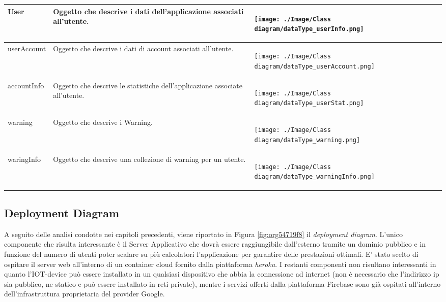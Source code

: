 \documentclass[onecolumn,a4paper]{article}
\begin{document}
\begin{longtable}{|l|p{5.2cm}|p{4cm}|}
\hline
User & Oggetto che descrive i dati dell'applicazione associati all'utente. & \begin{center}
\texttt{[image: ./Image/Class diagram/dataType\_userInfo.png]}
\end{center}\\
\hline
userAccount & Oggetto che descrive i dati di account associati all'utente. & \begin{center}
\texttt{[image: ./Image/Class diagram/dataType\_userAccount.png]}
\end{center}\\
\hline
accountInfo & Oggetto che descrive le statistiche dell'applicazione associate all'utente. & \begin{center}
\texttt{[image: ./Image/Class diagram/dataType\_userStat.png]}
\end{center}\\
\hline
warning & Oggetto che descrive i Warning. & \begin{center}
\texttt{[image: ./Image/Class diagram/dataType\_warning.png]}
\end{center}\\
\hline
waringInfo & Oggetto che descrive una collezione di warning per un utente. & \begin{center}
\texttt{[image: ./Image/Class diagram/dataType\_warningInfo.png]}
\end{center}\\
\hline
\end{longtable}

\subsection{Deployment Diagram}
\label{sec:org9752a8a}

A seguito delle analisi condotte nei capitoli precedenti, viene riportato in Figura \ref{fig:org54719f8} il \emph{deployment diagram}. L'unico componente che risulta interessante è il Server Applicativo che dovrà essere raggiungibile dall'esterno tramite un dominio pubblico e in funzione del numero di utenti poter scalare su più calcolatori l'applicazione per garantire delle prestazioni ottimali. E' stato scelto di ospitare il server web all'interno di un container cloud fornito dalla piattaforma \emph{heroku}. I restanti componenti non risultano interessanti in quanto l'IOT-device può essere installato in un qualsiasi dispositivo che abbia la connessione ad internet (non è necessario che l'indirizzo ip sia pubblico, ne statico e può essere installato in reti private), mentre i servizi offerti dalla piattaforma Firebase sono già ospitati all'interno dell'infrastruttura proprietaria del provider Google.
\end{document}
